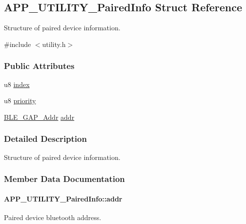 \hypertarget{struct_a_p_p___u_t_i_l_i_t_y___paired_info}{}\subsection{A\+P\+P\+\_\+\+U\+T\+I\+L\+I\+T\+Y\+\_\+\+Paired\+Info Struct Reference}
\label{struct_a_p_p___u_t_i_l_i_t_y___paired_info}


Structure of paired device information.  




{\ttfamily \#include $<$utility.\+h$>$}

\subsubsection*{Public Attributes}
\begin{DoxyCompactItemize}
\item 
u8 \hyperlink{struct_a_p_p___u_t_i_l_i_t_y___paired_info_a290fb7fb6f0cedb7defd38094147f4bc}{index}
\item 
u8 \hyperlink{struct_a_p_p___u_t_i_l_i_t_y___paired_info_a81fb387ef50bb118b4468320c7378aab}{priority}
\item 
\hyperlink{struct_b_l_e___g_a_p___addr}{B\+L\+E\+\_\+\+G\+A\+P\+\_\+\+Addr} \hyperlink{struct_a_p_p___u_t_i_l_i_t_y___paired_info_afa2f5f4d2cb30356bc9ad3a2bc2d24cc}{addr}
\end{DoxyCompactItemize}


\subsubsection{Detailed Description}
Structure of paired device information. 

\subsubsection{Member Data Documentation}
\paragraph[{\texorpdfstring{addr}{addr}}]{ A\+P\+P\+\_\+\+U\+T\+I\+L\+I\+T\+Y\+\_\+\+Paired\+Info\+::addr}\hypertarget{struct_a_p_p___u_t_i_l_i_t_y___paired_info_afa2f5f4d2cb30356bc9ad3a2bc2d24cc}{}\label{struct_a_p_p___u_t_i_l_i_t_y___paired_info_afa2f5f4d2cb30356bc9ad3a2bc2d24cc}
Paired device bluetooth address. 
